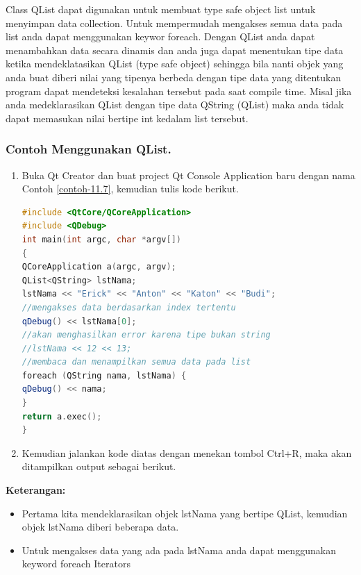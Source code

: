 Class QList dapat digunakan untuk membuat type safe object list untuk
menyimpan data collection. Untuk mempermudah mengakses semua data pada
list anda dapat menggunakan keywor foreach. Dengan QList anda dapat
menambahkan data secara dinamis dan anda juga dapat menentukan tipe data
ketika mendeklatasikan QList (type safe object) sehingga bila nanti
objek yang anda buat diberi nilai yang tipenya berbeda dengan tipe data
yang ditentukan program dapat mendeteksi kesalahan tersebut pada saat
compile time. Misal jika anda medeklarasikan QList dengan tipe data
QString (QList) maka anda tidak dapat memasukan nilai bertipe int
kedalam list tersebut.

\subsubsection*{Contoh Menggunakan QList.}

\begin{enumerate}

\item
  Buka Qt Creator dan buat project Qt Console Application baru dengan
  nama Contoh \ref{contoh-11.7}, kemudian tulis kode berikut.

\begin{lstlisting}[language=c++, caption=Menggunakan QList,label=contoh-11.7]
#include <QtCore/QCoreApplication>
#include <QDebug>
int main(int argc, char *argv[])
{
QCoreApplication a(argc, argv);
QList<QString> lstNama;
lstNama << "Erick" << "Anton" << "Katon" << "Budi";
//mengakses data berdasarkan index tertentu
qDebug() << lstNama[0];
//akan menghasilkan error karena tipe bukan string
//lstNama << 12 << 13;
//membaca dan menampilkan semua data pada list
foreach (QString nama, lstNama) {
qDebug() << nama;
}
return a.exec();
}
\end{lstlisting}
\item
  Kemudian jalankan kode diatas dengan menekan tombol Ctrl+R, maka akan
  ditampilkan output sebagai berikut.
\end{enumerate}

\textbf{Keterangan:}

\begin{itemize}

\item
  Pertama kita mendeklarasikan objek lstNama yang bertipe QList,
  kemudian objek lstNama diberi beberapa data.
\item
  Untuk mengakses data yang ada pada lstNama anda dapat menggunakan
  keyword foreach Iterators
\end{itemize}

